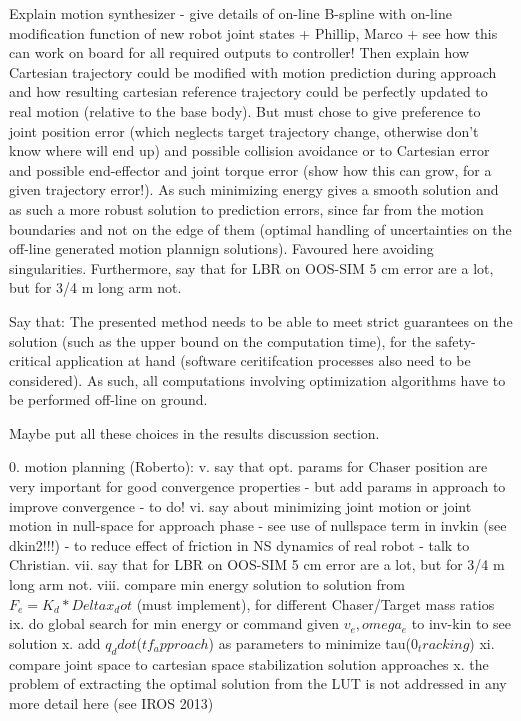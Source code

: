 Explain motion synthesizer - give details of on-line B-spline with on-line modification function of new robot joint states + Phillip, Marco + see how this can work on board for all required outputs to controller! Then explain how Cartesian trajectory could be modified with motion prediction during approach and how resulting cartesian reference trajectory could be perfectly updated to real motion (relative to the base body). But must chose to give preference to joint position error (which neglects target trajectory change, otherwise don't know where will end up) and possible collision avoidance or to Cartesian error and possible end-effector and joint torque error (show how this can grow, for a given trajectory error!). As such minimizing energy gives a smooth solution and as such a more robust solution to prediction errors, since far from the motion boundaries and not on the edge of them (optimal handling of uncertainties on the off-line generated motion plannign solutions). Favoured here avoiding singularities. Furthermore, say that for LBR on OOS-SIM 5 cm error are a lot, but for 3/4 m long arm not. 

Say that: The presented method needs to be able to meet strict guarantees on the solution (such as the upper bound on the computation time), for the safety-critical application at hand (software ceritifcation processes also need to be considered). As such, all computations involving optimization algorithms have to be performed off-line on ground. 


Maybe put all these choices in the results discussion section.


0. motion planning (Roberto):
	v. say that opt. params for Chaser position are very important for good convergence properties - but add params in approach to improve convergence - to do!
	vi. say about minimizing joint motion or joint motion in null-space for approach phase - see use of nullspace term in invkin (see dkin2!!!) - to reduce effect of friction in NS dynamics of real robot - talk to Christian.
	vii. say that for LBR on OOS-SIM 5 cm error are a lot, but for 3/4 m long arm not.
	viii. compare min energy solution to solution from $F_e=K_d * Deltax_dot$ (must implement), for different Chaser/Target mass ratios
	ix. do global search for min energy or command given $v_e, omega_e$ to inv-kin to see solution
	x. add $q_ddot$($tf_approach$) as parameters to minimize tau($0_tracking$)
	xi. compare joint space to cartesian space stabilization solution approaches
	x. the problem of extracting the optimal solution from the LUT is not addressed in any more detail here (see IROS 2013)

